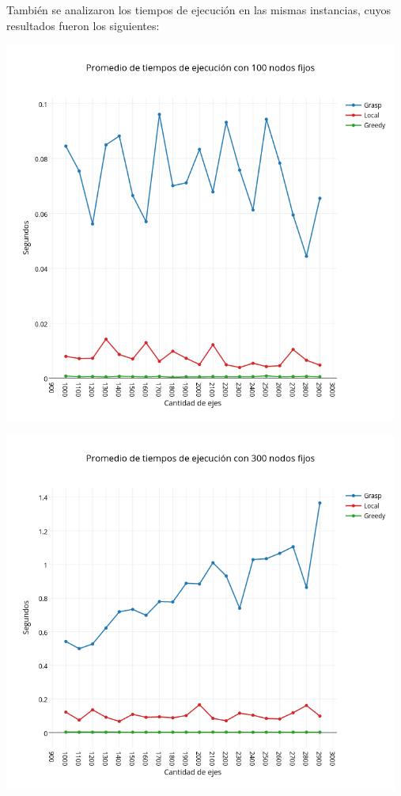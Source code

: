 También se analizaron los tiempos de ejecución en las mismas instancias, cuyos resultados fueron los siguientes:

\begin{center}
 	\includegraphics[width=13cm, keepaspectratio=yes]{imagenes/coliseo/Fixnode/100.png}

 	\includegraphics[width=13cm, keepaspectratio=yes]{imagenes/coliseo/Fixnode/300.png}


\end{center}
